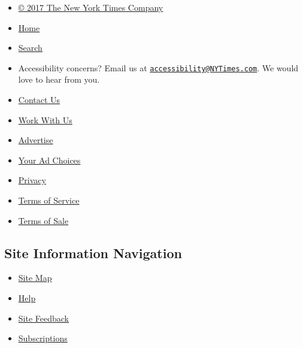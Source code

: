 \begin{itemize}
\tightlist
\item
  \href{//www.nytimes3xbfgragh.onion/content/help/rights/copyright/copyright-notice.html}{©
  2017 The New York Times Company}
\item
  \href{//www.nytimes3xbfgragh.onion}{Home}
\item
  \href{//query.nytimes3xbfgragh.onion/search/sitesearch/\#/}{Search}
\item
  Accessibility concerns? Email us at
  \href{mailto:accessibility@NYTimes.com}{\nolinkurl{accessibility@NYTimes.com}}.
  We would love to hear from you.
\item
  \href{//www.nytimes3xbfgragh.onion/ref/membercenter/help/infoservdirectory.html}{Contact
  Us}
\item
  \href{//www.nytco.com/careers}{Work With Us}
\item
  \href{//nytmediakit.com/}{Advertise}
\item
  \href{//www.nytimes3xbfgragh.onion/content/help/rights/privacy/policy/privacy-policy.html\#pp}{Your
  Ad Choices}
\item
  \href{//www.nytimes3xbfgragh.onion/privacy}{Privacy}
\item
  \href{//www.nytimes3xbfgragh.onion/ref/membercenter/help/agree.html}{Terms
  of Service}
\item
  \href{//www.nytimes3xbfgragh.onion/content/help/rights/sale/terms-of-sale.html}{Terms
  of Sale}
\end{itemize}

\hypertarget{site-information-navigation-1}{%
\subsection{Site Information
Navigation}\label{site-information-navigation-1}}

\begin{itemize}
\tightlist
\item
  \href{//spiderbites.nytimes3xbfgragh.onion}{Site Map}
\item
  \href{//www.nytimes3xbfgragh.onion/membercenter/sitehelp.html}{Help}
\item
  \href{https://myaccount.nytimes3xbfgragh.onion/membercenter/feedback.html}{Site
  Feedback}
\item
  \href{//www.nytimes3xbfgragh.onion/subscriptions/Multiproduct/lp5558.html?campaignId=37WXW}{Subscriptions}
\end{itemize}
